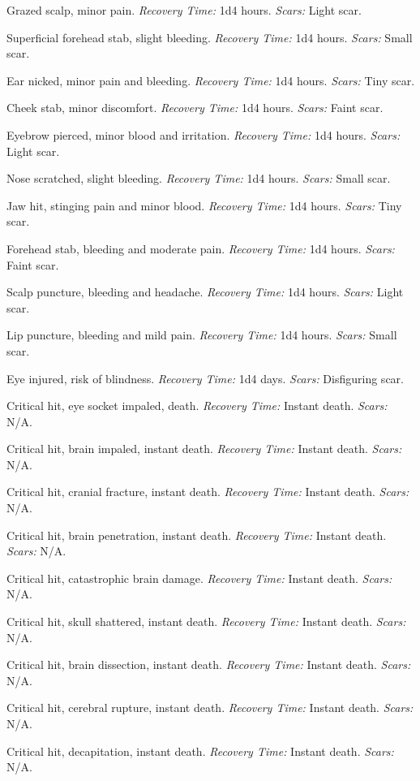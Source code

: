 \documentclass[12pt]{book}  %
\begin{document}
\begin{description}[labelwidth=1.5em, leftmargin=*, itemsep=0.4em]
    \item[1 -] Grazed scalp, minor pain. \textit{Recovery Time:} 1d4 hours. \textit{Scars:} Light scar.
    \item[2 -] Superficial forehead stab, slight bleeding. \textit{Recovery Time:} 1d4 hours. \textit{Scars:} Small scar.
    \item[3 -] Ear nicked, minor pain and bleeding. \textit{Recovery Time:} 1d4 hours. \textit{Scars:} Tiny scar.
    \item[4 -] Cheek stab, minor discomfort. \textit{Recovery Time:} 1d4 hours. \textit{Scars:} Faint scar.
    \item[5 -] Eyebrow pierced, minor blood and irritation. \textit{Recovery Time:} 1d4 hours. \textit{Scars:} Light scar.
    \item[6 -] Nose scratched, slight bleeding. \textit{Recovery Time:} 1d4 hours. \textit{Scars:} Small scar.
    \item[7 -] Jaw hit, stinging pain and minor blood. \textit{Recovery Time:} 1d4 hours. \textit{Scars:} Tiny scar.
    \item[8 -] Forehead stab, bleeding and moderate pain. \textit{Recovery Time:} 1d4 hours. \textit{Scars:} Faint scar.
    \item[9 -] Scalp puncture, bleeding and headache. \textit{Recovery Time:} 1d4 hours. \textit{Scars:} Light scar.
    \item[10 -] Lip puncture, bleeding and mild pain. \textit{Recovery Time:} 1d4 hours. \textit{Scars:} Small scar.
    \item[11 -] Eye injured, risk of blindness. \textit{Recovery Time:} 1d4 days. \textit{Scars:} Disfiguring scar.
    \item[12 -] Critical hit, eye socket impaled, death. \textit{Recovery Time:} Instant death. \textit{Scars:} N/A.
    \item[13 -] Critical hit, brain impaled, instant death. \textit{Recovery Time:} Instant death. \textit{Scars:} N/A.
    \item[14 -] Critical hit, cranial fracture, instant death. \textit{Recovery Time:} Instant death. \textit{Scars:} N/A.
    \item[15 -] Critical hit, brain penetration, instant death. \textit{Recovery Time:} Instant death. \textit{Scars:} N/A.
    \item[16 -] Critical hit, catastrophic brain damage. \textit{Recovery Time:} Instant death. \textit{Scars:} N/A.
    \item[17 -] Critical hit, skull shattered, instant death. \textit{Recovery Time:} Instant death. \textit{Scars:} N/A.
    \item[18 -] Critical hit, brain dissection, instant death. \textit{Recovery Time:} Instant death. \textit{Scars:} N/A.
    \item[19 -] Critical hit, cerebral rupture, instant death. \textit{Recovery Time:} Instant death. \textit{Scars:} N/A.
    \item[20 -] Critical hit, decapitation, instant death. \textit{Recovery Time:} Instant death. \textit{Scars:} N/A.
\end{description}
\end{document}
